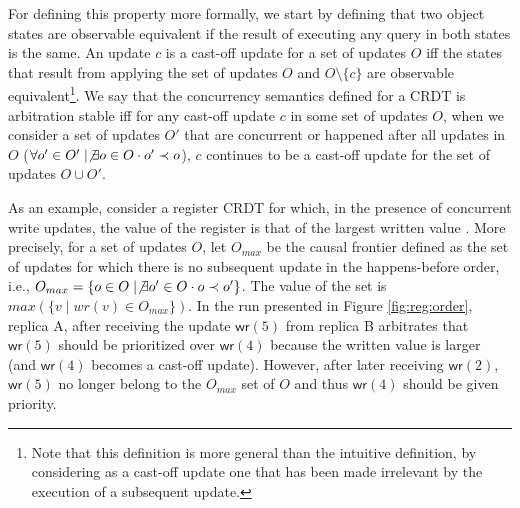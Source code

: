 \documentclass[12pt]{article}
\begin{document}
For defining this property more formally, we start by defining that two object 
states are observable equivalent if the result of executing any query in both states
is the same. 
An update $c$ is a cast-off update for a set of updates $O$ iff 
the states that result from applying the set of updates $O$ and 
$O \setminus \{c\}$ are observable equivalent\footnote{Note that this definition 
is more general than the intuitive definition, by considering as a cast-off update
one that has been made irrelevant by the execution of a subsequent update.}.
We say that the concurrency semantics defined for a CRDT is arbitration stable 
iff for any cast-off update $c$ in some set of updates $O$, 
when we consider a set of updates $O'$ that are concurrent or happened after all 
updates in $O$ ($\forall o' \in O' \mid \not \exists o \in O \cdot o' \prec o$), $c$ continues to 
be a cast-off update for the set of updates $O \cup O'$.



As an example, consider a register CRDT for which, in the presence of concurrent write updates,
the value of the register is that of the largest written value \cite{Zawirski:2016:ECR:2911151.2911157}.
More precisely, for a set of updates $O$, let $O_{max}$ be the causal frontier 
defined as the set of updates 
for which there is no subsequent update in the happens-before order, i.e., 
$O_{max} =\{o \in O \mid \not \exists o' \in O \cdot o \prec o'\}$.
The value of the set is $max(\{ v \mid wr(v) \in O_{max}\})$.
In the run presented in Figure \ref{fig:reg:order}, replica A, after receiving
the update $\mathsf{wr}(5)$ from replica B arbitrates that $\mathsf{wr}(5)$ should
be prioritized over $\mathsf{wr}(4)$ because the written value is larger (and 
$\mathsf{wr}(4)$ becomes a cast-off update). 
However, after later receiving $\mathsf{wr}(2)$, $\mathsf{wr}(5)$ no longer belong 
to the $O_{max}$ set of $O$ and thus $\mathsf{wr}(4)$ should be given priority.
\end{document}
